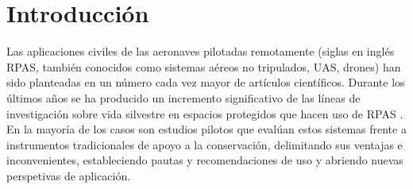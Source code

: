 \documentclass[twocolumn]{extarticle}
\begin{document}
\noindent \doublespacing \section{Introducción}\label{introduccion}

\small

Las aplicaciones civiles de las aeronaves pilotadas remotamente (siglas
en inglés RPAS, también conocidos como sistemas aéreos no tripulados,
UAS, drones) han sido planteadas en un número cada vez mayor de
artículos científicos. Durante los últimos años se ha producido un
incremento significativo de las líneas de investigación sobre vida
silvestre en espacios protegidos que hacen uso de RPAS
\citep{Linchant2015} \citep{Christie2016}. En la mayoría de los casos
son estudios pilotos que evalúan estos sistemas frente a instrumentos
tradicionales de apoyo a la conservación, delimitando sus ventajas e
inconvenientes, estableciendo pautas y recomendaciones de uso y abriendo
nuevas perspetivas de aplicación.
\end{document}
